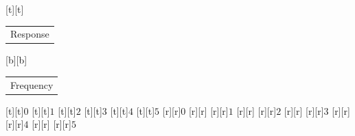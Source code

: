 %    
%
%
\begin{psfrags}%
\psfragscanon%
%
[t][t]{\color[rgb]{0,0,0}\setlength{\tabcolsep}{0pt}\begin{tabular}{c}\Large{}Response\end{tabular}}%
[b][b]{\color[rgb]{0,0,0}\setlength{\tabcolsep}{0pt}\begin{tabular}{c}\Large{}Frequency\end{tabular}}%
%
[t][t]{$0$}%
[t][t]{$1$}%
[t][t]{$2$}%
[t][t]{$3$}%
[t][t]{$4$}%
[t][t]{$5$}%
%
[r][r]{$0$}%
[r][r]{}%
[r][r]{$1$}%
[r][r]{}%
[r][r]{$2$}%
[r][r]{}%
[r][r]{$3$}%
[r][r]{}%
[r][r]{$4$}%
[r][r]{}%
[r][r]{$5$}%
%
%
\end{psfrags}%
%
